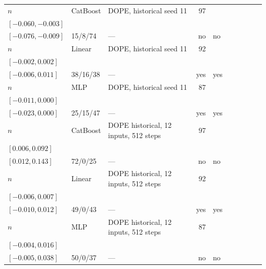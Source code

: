 \begin{longtable}{@{}ll>{\raggedright\arraybackslash}p{1.1in}rllrlll@{}}
$n$ & CatBoost & DOPE, historical seed 11 & 97 & \begin{tabular}[t]{@{}l@{}}$-0.022$\\\tiny$[-0.060, -0.003]$\end{tabular} & \begin{tabular}[t]{@{}l@{}}$-0.034$\\\tiny$[-0.076, -0.009]$\end{tabular} & 15/8/74 & --- & no & no \\
$n$ & Linear & DOPE, historical seed 11 & 92 & \begin{tabular}[t]{@{}l@{}}$0.000$\\\tiny$[-0.002, 0.002]$\end{tabular} & \begin{tabular}[t]{@{}l@{}}$0.001$\\\tiny$[-0.006, 0.011]$\end{tabular} & 38/16/38 & --- & yes & yes \\
$n$ & MLP & DOPE, historical seed 11 & 87 & \begin{tabular}[t]{@{}l@{}}$-0.003$\\\tiny$[-0.011, 0.000]$\end{tabular} & \begin{tabular}[t]{@{}l@{}}$-0.007$\\\tiny$[-0.023, 0.000]$\end{tabular} & 25/15/47 & --- & yes & yes \\
$n$ & CatBoost & DOPE historical, 12 inputs, 512 steps & 97 & \begin{tabular}[t]{@{}l@{}}$0.032$\\\tiny$[0.006, 0.092]$\end{tabular} & \begin{tabular}[t]{@{}l@{}}$0.060$\\\tiny$[0.012, 0.143]$\end{tabular} & 72/0/25 & --- & no & no \\
$n$ & Linear & DOPE historical, 12 inputs, 512 steps & 92 & \begin{tabular}[t]{@{}l@{}}$0.002$\\\tiny$[-0.006, 0.007]$\end{tabular} & \begin{tabular}[t]{@{}l@{}}$0.001$\\\tiny$[-0.010, 0.012]$\end{tabular} & 49/0/43 & --- & yes & yes \\
$n$ & MLP & DOPE historical, 12 inputs, 512 steps & 87 & \begin{tabular}[t]{@{}l@{}}$0.007$\\\tiny$[-0.004, 0.016]$\end{tabular} & \begin{tabular}[t]{@{}l@{}}$0.015$\\\tiny$[-0.005, 0.038]$\end{tabular} & 50/0/37 & --- & no & no \\

\end{longtable}
